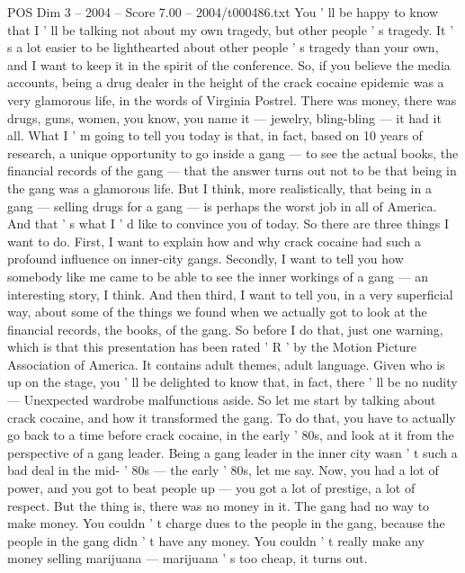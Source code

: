 \begin{textsample}{POS Dim 3 – 2004 – Score 7.00 – 2004/t000486.txt}  \label{ex:f3_pos_071}
You ' ll be happy to know that I ' ll be talking not about my own tragedy, but other people ' s tragedy.
It ' s a lot easier to be lighthearted about other people ' s tragedy than your own, and I want to keep it in the spirit of the conference.
So, if you believe the media accounts, being a drug dealer in the height of the crack cocaine epidemic was a very glamorous life, in the words of Virginia Postrel.
There was money, there was drugs, guns, women, you know, you name it — jewelry, bling-bling — it had it all.
What I ' m going to tell you today is that, in fact, based on 10 years of research, a unique opportunity to go inside a gang — to see the actual books, the financial records of the gang — that the answer turns out not to be that being in the gang was a glamorous life.
But I think, more realistically, that being in a gang — selling drugs for a gang — is perhaps the worst job in all of America.
And that ' s what I ' d like to convince you of today.
So there are three things I want to do.
First, I want to explain how and why crack cocaine had such a profound influence on inner-city gangs.
Secondly, I want to tell you how somebody like me came to be able to see the inner workings of a gang — an interesting story, I think.
And then third, I want to tell you, in a very superficial way, about some of the things we found when we actually got to look at the financial records, the books, of the gang.
So before I do that, just one warning, which is that this presentation has been rated ' R ' by the Motion Picture Association of America.
It contains adult themes, adult language.
Given who is up on the stage, you ' ll be delighted to know that, in fact, there ' ll be no nudity — Unexpected wardrobe malfunctions aside.
So let me start by talking about crack cocaine, and how it transformed the gang.
To do that, you have to actually go back to a time before crack cocaine, in the early ' 80s, and look at it from the perspective of a gang leader.
Being a gang leader in the inner city wasn ' t such a bad deal in the mid- ' 80s — the early ' 80s, let me say.
Now, you had a lot of power, and you got to beat people up — you got a lot of prestige, a lot of respect.
But the thing is, there was no money in it.
The gang had no way to make money.
You couldn ' t charge dues to the people in the gang, because the people in the gang didn ' t have any money.
You couldn ' t really make any money selling marijuana — marijuana ' s too cheap, it turns out.

\end{textsample}
